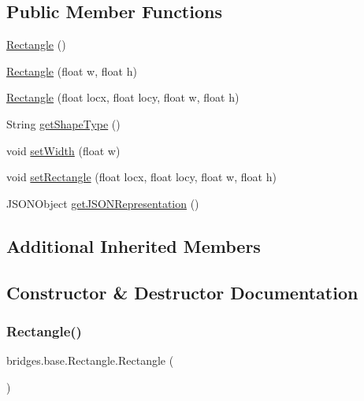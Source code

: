 \subsection*{Public Member Functions}
\begin{DoxyCompactItemize}
\item 
\hyperlink{classbridges_1_1base_1_1_rectangle_a6d80c63a14e9b94df552dac422348dc3}{Rectangle} ()
\item 
\hyperlink{classbridges_1_1base_1_1_rectangle_ae23e33dbe811d3f49b542b02d1800952}{Rectangle} (float w, float h)
\item 
\hyperlink{classbridges_1_1base_1_1_rectangle_a4df21db188c66f5635191f306a29c7e3}{Rectangle} (float locx, float locy, float w, float h)
\item 
String \hyperlink{classbridges_1_1base_1_1_rectangle_aa3bdc4d893e1017d78edff810aab65b4}{get\+Shape\+Type} ()
\item 
void \hyperlink{classbridges_1_1base_1_1_rectangle_a1c42d0e5fc64adc1c2a696c88dd6f82e}{set\+Width} (float w)
\item 
void \hyperlink{classbridges_1_1base_1_1_rectangle_a267eafb8107ea074598fbf4d2d3dc72d}{set\+Rectangle} (float locx, float locy, float w, float h)
\item 
J\+S\+O\+N\+Object \hyperlink{classbridges_1_1base_1_1_rectangle_ad9a44cbdc301594b8708769461ad4461}{get\+J\+S\+O\+N\+Representation} ()
\end{DoxyCompactItemize}
\subsection*{Additional Inherited Members}


\subsection{Constructor \& Destructor Documentation}
\mbox{\label{classbridges_1_1base_1_1_rectangle_a6d80c63a14e9b94df552dac422348dc3}} 
\subsubsection{\texorpdfstring{Rectangle()}{Rectangle()}\hspace{0.1cm}{\footnotesize\ttfamily [1/3]}}
{\footnotesize\ttfamily bridges.\+base.\+Rectangle.\+Rectangle (\begin{DoxyParamCaption}{ }\end{DoxyParamCaption})}

